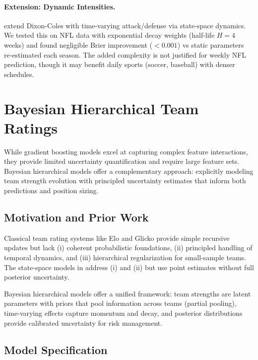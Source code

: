 \paragraph{Extension: Dynamic Intensities.}
\citet{koopman2015} extend Dixon-Coles with time-varying attack/defense via state-space dynamics. We tested this on NFL data with exponential decay weights (half-life $H\!=\!4$ weeks) and found negligible Brier improvement ($<0.001$) vs static parameters re-estimated each season. The added complexity is not justified for weekly NFL prediction, though it may benefit daily sports (soccer, baseball) with denser schedules.

\section{Bayesian Hierarchical Team Ratings}\label{sec:bayesian-hierarchical}

While gradient boosting models excel at capturing complex feature interactions, they provide limited uncertainty quantification and require large feature sets. Bayesian hierarchical models offer a complementary approach: explicitly modeling team strength evolution with principled uncertainty estimates that inform both predictions and position sizing.

\subsection{Motivation and Prior Work}

Classical team rating systems like Elo \citep{elo1978} and Glicko \citep{glickman1999} provide simple recursive updates but lack (i) coherent probabilistic foundations, (ii) principled handling of temporal dynamics, and (iii) hierarchical regularization for small-sample teams. The state-space models in  address (i) and (ii) but use point estimates without full posterior uncertainty.

Bayesian hierarchical models \citep{gelman2013} offer a unified framework: team strengths are latent parameters with priors that pool information across teams (partial pooling), time-varying effects capture momentum and decay, and posterior distributions provide calibrated uncertainty for risk management.

\subsection{Model Specification}


